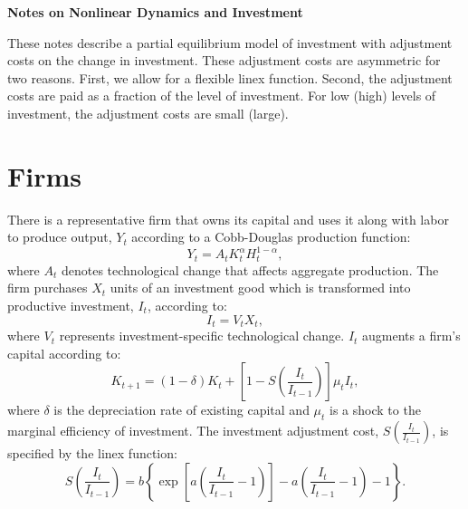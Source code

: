 \documentclass[11pt,fleqn]{article}
\begin{document}
\doublespacing

\begin{center}
\textbf{\Large Notes on Nonlinear Dynamics and Investment}
\end{center}

These notes describe a partial equilibrium model of investment with adjustment costs on the change in investment.  These adjustment costs are asymmetric for two reasons.  First, we allow for a flexible linex function.  Second, the adjustment costs are paid as a fraction of the level of investment.  For low (high) levels of investment, the adjustment costs are small (large). 

\section{Firms}

There is a representative firm that owns its capital and uses it along with labor to produce output, $Y_t$ according to a Cobb-Douglas production function:
\begin{equation}
Y_t = A_t K^{\alpha}_t H^{1-\alpha}_t,  \label{production_function}
\end{equation}
where $A_t$ denotes technological change that affects aggregate production.
The firm purchases $X_t$ units of an investment good which is transformed into productive investment, $I_t$, according to:
\begin{equation}
I_t = V_t X_t, \label{inv_production}
\end{equation}
where $V_t$ represents investment-specific technological change. $I_t$ augments a firm's capital according to:
\begin{equation} 
K_{t+1} = (1-\delta) K_t +\left[1-  S\left(\frac{I_t}{I_{t-1}}\right) \right] \mu_t I_t,  \label{capital_accumulation}
\end{equation}
where $\delta$ is the depreciation rate of existing capital and $\mu_t$ is a shock to the marginal efficiency of investment.  The investment adjustment cost, $S\left(\frac{I_t}{I_{t-1}}\right)$, is specified by the linex function:
\begin{equation}
S\left(\frac{I_t}{I_{t-1}}\right) =  b \left\{\exp\left[ a \left(\frac{I_t}{I_{t-1}}-1\right)\right]-a\left(\frac{I_t}{I_{t-1}}-1\right)-1\right\}.
\end{equation}
\end{document}
